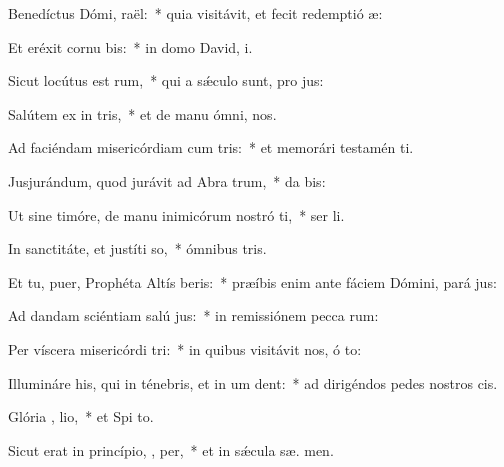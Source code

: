 \item Benedíctus Dómi,  raël:~* quia visitávit, et fecit redemptió  æ:
\item Et eréxit cornu  bis:~* in domo David,  i.
\item Sicut locútus est   rum,~* qui a sǽculo sunt, pro jus:
\item Salútem ex in tris,~* et de manu ómni,   nos.
\item Ad faciéndam misericórdiam cum  tris:~* et memorári testamén  ti.
\item Jusjurándum, quod jurávit ad Abra  trum,~* da  bis:
\item Ut sine timóre, de manu inimicórum nostró ti,~* ser li.
\item In sanctitáte, et justíti  so,~* ómnibus  tris.
\item Et tu, puer, Prophéta Altís beris:~* præíbis enim ante fáciem Dómini, pará  jus:
\item Ad dandam sciéntiam salú  jus:~* in remissiónem pecca rum:
\item Per víscera misericórdi  tri:~* in quibus visitávit nos, ó  to:
\item Illumináre his, qui in ténebris, et in um  dent:~* ad dirigéndos pedes nostros   cis.
\item Glória ,  lio,~* et Spi to.
\item Sicut erat in princípio,  ,  per,~* et in sǽcula sæ. men.
